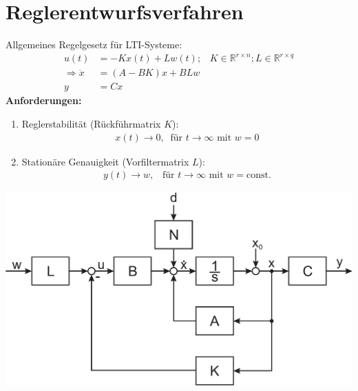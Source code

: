 \documentclass[a4paper,twocolumn,10pt]{article}
\begin{document}
\section{Reglerentwurfsverfahren}
Allgemeines Regelgesetz für LTI-Systeme:
\begin{align*}
u(t)&=-Kx(t)+Lw(t);\;\;\;K\in\mathbb{R}^{r\times n};L\in\mathbb{R}^{r\times q}\\
\Rightarrow\dot{x}&=(A-BK)x+BLw\\
y&=Cx
\end{align*}
\textbf{Anforderungen:}
\begin{enumerate}[label=$\bullet$]
\item Reglerstabilität (Rückführmatrix $K$):
\begin{align*}
x(t)\rightarrow 0,\;\;\text{für }t\rightarrow\infty\text{ mit }w=0
\end{align*}
\item Stationäre Genauigkeit (Vorfiltermatrix $L$):
\begin{align*}
y(t)\rightarrow w,\;\;\;\text{für }t\rightarrow\infty\text{ mit }w=\text{const.}
\end{align*}
\end{enumerate}
\begin{center}
\includegraphics[width=0.98\columnwidth]{Grafiken/Struktur_Zustandsregelung}
\end{center}
\end{document}
